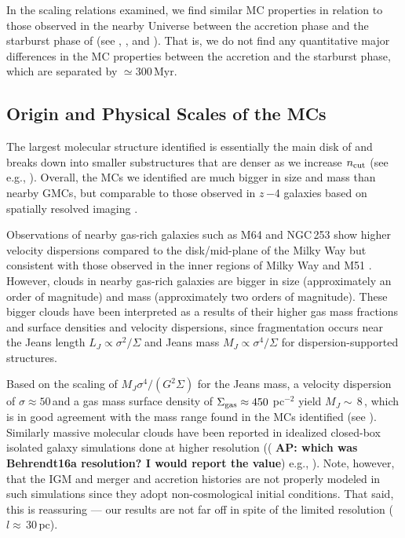 \IfFileExists{emulateapjlegacy.cls}{\documentclass[iop]{emulateapjlegacy}}{\documentclass[iop]{emulateapj}}
\newcommand{\AP}[1]{({\bf \color{apcolor} AP: #1})}
\begin{document}
In the scaling relations examined, we find similar MC properties in relation to those observed in the nearby Universe between the accretion phase and the starburst phase of \flower (see , , and ). That is, we do not find any quantitative major differences in the MC properties between the accretion and the starburst phase, which are separated by $\simeq$300\,Myr.

\subsection{Origin and Physical Scales of the MCs} \label{sec:origin}

The largest molecular structure identified is essentially the main disk of \flower and breaks down into smaller substructures that are denser as we increase $n_{\rm cut}$ (see e.g., ). Overall, the MCs we identified are much bigger in size and mass than nearby GMCs, but comparable to those observed in $z$\,$-$4 galaxies based on spatially resolved imaging \citep{Swinbank11a}.

Observations of nearby gas-rich galaxies such as M64 and NGC\,253 show higher velocity dispersions compared to the disk/mid-plane of the Milky Way but consistent with those observed in the inner regions of Milky Way and M51 \citep{Oka01a, Rosolowsky05a, Heyer09a, Hughes13b, Leroy15a, Rice16a}.  %
However, clouds in nearby gas-rich galaxies are bigger in size (approximately an order of magnitude) and mass (approximately two orders of magnitude). These bigger clouds have been interpreted as a results of their higher gas mass fractions and surface densities and velocity dispersions, since fragmentation occurs near the Jeans length $L_J\propto\sigma^2/\Sigma$ and Jeans mass $M_J\propto\sigma^4/\Sigma$ for dispersion-supported structures.

Based on the scaling of $M_J$\eq$\sigma^4/(G^2\Sigma)$ for the Jeans mass, a velocity dispersion of $\sigma\approx50$\,\kms and a gas mass surface density of $\Sigma_{\rm gas}\approx450$\,\Msun\,pc$^{-2}$ yield $M_J\sim$\,8\,\Msun, which is in good agreement with the mass range found in the MCs identified (see ).
%
Similarly massive molecular clouds have been reported in idealized closed-box isolated galaxy simulations done at higher resolution (\AP{which was Behrendt16a resolution? I would report the value} e.g., \citealt{Behrendt16a}). Note, however, that the IGM and merger and accretion histories are not properly modeled in such simulations since they adopt non-cosmological initial conditions. That said, this is reassuring --- our results are not far off in spite of the limited resolution ($l\approx$\,30\,pc).
\end{document}
